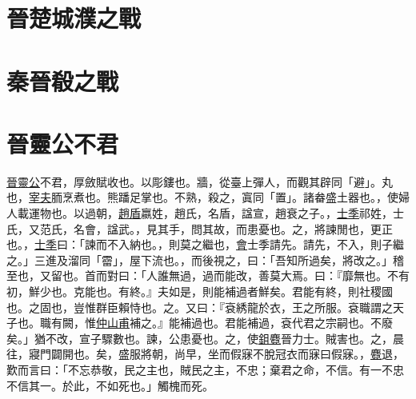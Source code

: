 \documentclass{article}
\newcommand{\tsu}{\small\kaishu\color{brown}}
\begin{document}
\section{晉楚城濮之戰}

\section{秦晉殽之戰}

\section{晉靈公不君}

\noindent{\tsu 宣公二年}

\uline{晉靈公}不君，厚斂{\tsu 賦收也。}以彫{\tsu 鏤也。}牆，從臺上彈人，而觀其辟{\tsu 同「避」。}丸也，\uline{宰夫}胹{\tsu 烹煮也。}熊蹯{\tsu 足掌也。}不熟，殺之，寘{\tsu 同「置」。}諸畚{\tsu 盛土器也。}，使婦人載{\tsu 運物也。}以過朝，\uline{趙盾}{\tsu 嬴姓，趙氏，名盾，諡宣，趙衰之子。}，\uline{士季}{\tsu 祁姓，士氏，又范氏，名會，諡武。}，見其手，問其故，而患{\tsu 憂也。}之，將諫{\tsu 閒也，更正也。}，\uline{士季}曰：「諫而不入{\tsu 納也。}，則莫之繼也，\uline{會}{\tsu 士季請先。}請先，不入，則子繼之。」三進及溜{\tsu 同「霤」，屋下流也。}，而後視之，曰：「吾知所過矣，將改之。」稽{\tsu 至也，又留也。}首而對曰：「人誰無過，過而能改，善莫大焉。曰：『靡{\tsu 無也。}不有初，鮮{\tsu 少也。}克{\tsu 能也。}有終。』夫如是，則能補過者鮮矣。君能有終，則社稷{\tsu 國也。}之固也，豈惟群臣賴{\tsu 恃也。}之。又曰：『袞{\tsu 綉龍於衣，王之所服。袞職謂之天子也。}職有闕，惟\uline{仲山甫}補之。』能補過也。君能補過，袞{\tsu 代君之宗嗣也。}不廢矣。」猶不改，宣子驟{\tsu 數也。}諫，公患{\tsu 憂也。}之，使\uline{鉏麑}{\tsu 晉力士。}賊{\tsu 害也。}之，晨往，寢門闢{\tsu 開也。}矣，盛服將朝，尚早，坐而假寐{\tsu 不脫冠衣而寐曰假寐。}，\uline{麑}退，歎而言曰：「不忘恭敬，民之主也，賊民之主，不忠；棄君之命，不信。有一{\tsu 不忠不信其一。}於此，不如死也。」觸槐而死。
\end{document}
